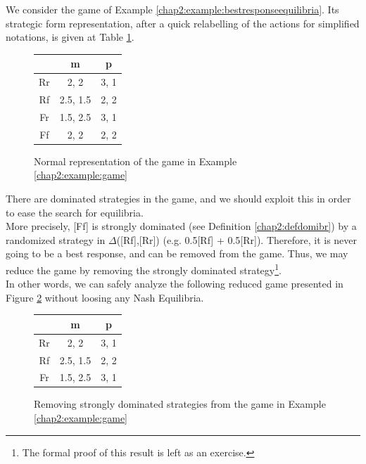 \begin{example}
We consider the game of Example \ref{chap2:example:bestresponseequilibria}. Its strategic form representation, after a quick relabelling of the actions for simplified notations, is given at Table \ref{chap3:tablefromchap2}.


\begin{figure}[!ht]
\centering
\begin{tabular}{c|cc}
 & m & p \\
\hline
Rr & 2, 2 & 3, 1 \\
Rf & 2.5, 1.5 & 2, 2 \\
Fr & 1.5, 2.5 & 3, 1 \\
Ff & 2, 2 & 2, 2 
\end{tabular}
\caption{Normal representation of the game in Example \ref{chap2:example:game}}
\label{chap3:tablefromchap2}
\end{figure}

 

There are dominated strategies in the game, and  we should exploit this in order to ease the search for equilibria.\\
More precisely, [Ff] is strongly dominated (see Definition \ref{chap2:defdomibr})  by a randomized strategy in $\Delta$([Rf],[Rr]) (e.g. 0.5[Rf] + 0.5[Rr]).
Therefore, it is never going to be a best response, and can be removed from the game. 
Thus, we may reduce the game by removing the strongly dominated strategy\footnote{The formal proof of this result is left as an exercise.}.\\
In other words,  we can safely analyze the following reduced game presented in Figure \ref{chap3:tablefromchap2-reduced} without loosing any Nash Equilibria.
\begin{figure}[!ht]
\centering
\begin{tabular}{c|cc}
 & m & p \\
\hline
Rr & 2, 2 & 3, 1 \\
Rf & 2.5, 1.5 & 2, 2 \\
Fr & 1.5, 2.5 & 3, 1  
\end{tabular}
\caption{Removing strongly dominated strategies from the game in Example \ref{chap2:example:game}}
\label{chap3:tablefromchap2-reduced}
\end{figure}


\end{example}
